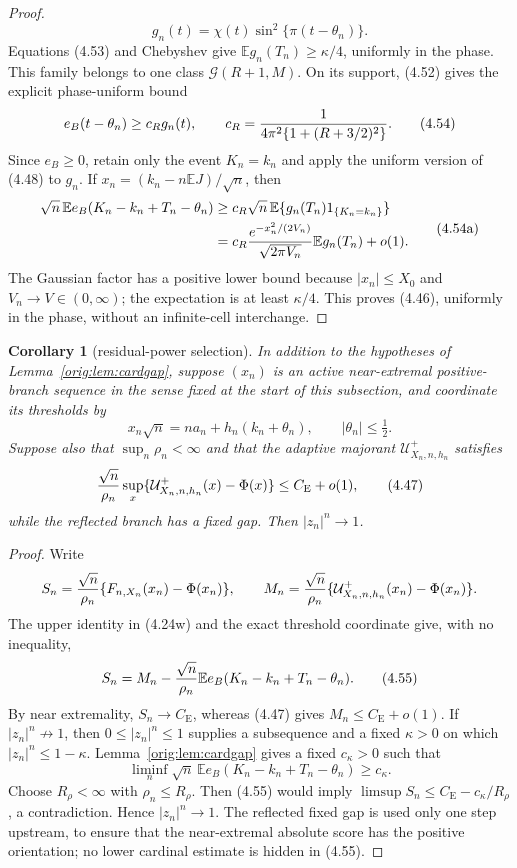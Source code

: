 \documentclass[11pt,a4paper]{article}
\numberwithin{equation}{section}
\newtheorem{corollary}[theorem]{Corollary}
\theoremstyle{definition}
\theoremstyle{remark}
\newcommand{\E}{\mathbb E}
\newcommand{\CE}{C_{\mathrm E}}
\begin{document}
\begin{proof}
\[
 g_n(t)=\chi(t)\sin^2\{\pi(t-\theta_n)\}.
\]
Equations (4.53) and Chebyshev give
\(\E g_n(T_n)\ge\kappa/4\), uniformly in the phase.  This family belongs
to one class \(\mathscr G(R+1,M)\).  On its support, (4.52) gives the
explicit phase-uniform bound
\[
 e_B(t-\theta_n)\ge c_Rg_n(t),\qquad
 c_R={1\over4\pi^2\{1+(R+3/2)^2\}}.                  \tag{4.54}
\]
Since $e_B\ge0$, retain only the event $K_n=k_n$ and apply the uniform
version of (4.48) to $g_n$.  If
\(x_n=(k_n-n\E J)/\sqrt n\), then
\[
 \begin{split}
 \sqrt n\,\E e_B(K_n-k_n+T_n-\theta_n)
 &\ge c_R\sqrt n\,
       \E\{g_n(T_n)1_{\{K_n=k_n\}}\}\\
 &=c_R{e^{-x_n^2/(2V_n)}\over\sqrt{2\pi V_n}}
       \E g_n(T_n)+o(1).
 \end{split}                                           \tag{4.54a}
\]
The Gaussian factor has a positive lower bound because
\(|x_n|\le X_0\) and \(V_n\to V\in(0,\infty)\); the expectation is at
least \(\kappa/4\).  This proves (4.46), uniformly in the phase, without
an infinite-cell interchange.
\end{proof}

\begin{corollary}[residual-power selection]\label{orig:cor:respower}
In addition to the hypotheses of Lemma~\ref{orig:lem:cardgap}, suppose
\((x_n)\) is an active near-extremal positive-branch sequence in the sense
fixed at the start of this subsection, and coordinate its thresholds by
\[
 x_n\sqrt n=na_n+h_n(k_n+\theta_n),\qquad |\theta_n|\le\tfrac12.
\]
Suppose also that $\sup_n\rho_n<\infty$ and that the adaptive majorant
 $\mathcal U^+_{X_n,n,h_n}$ satisfies
\[
 {\sqrt n\over\rho_n}\sup_x
       \{\mathcal U^+_{X_n,n,h_n}(x)-\Phi(x)\}
 \le\CE+o(1),                                         \tag{4.47}
\]
while the reflected branch has a fixed gap.  Then $|z_n|^n\to1$.
\end{corollary}

\begin{proof}
Write
\[
 S_n={\sqrt n\over\rho_n}\{F_{n,X_n}(x_n)-\Phi(x_n)\},\qquad
 M_n={\sqrt n\over\rho_n}
       \{\mathcal U^+_{X_n,n,h_n}(x_n)-\Phi(x_n)\}.
\]
The upper identity in (4.24w) and the exact threshold coordinate give,
with no inequality,
\[
 S_n=M_n-{\sqrt n\over\rho_n}
       \E e_B(K_n-k_n+T_n-\theta_n).                  \tag{4.55}
\]
By near extremality, \(S_n\to\CE\), whereas (4.47) gives
\(M_n\le\CE+o(1)\).  If \(|z_n|^n\not\to1\), then
\(0\le |z_n|^n\le1\) supplies a subsequence and a fixed \(\kappa>0\) on
which \(|z_n|^n\le1-\kappa\).  Lemma~\ref{orig:lem:cardgap} gives a fixed
\(c_\kappa>0\) such that
\[
 \liminf_n\sqrt n\,
 \E e_B(K_n-k_n+T_n-\theta_n)\ge c_\kappa.
\]
Choose \(R_\rho<\infty\) with \(\rho_n\le R_\rho\).  Then (4.55) would imply
\(\limsup S_n\le\CE-c_\kappa/R_\rho\), a contradiction.  Hence
\(|z_n|^n\to1\).  The reflected fixed gap is used only one step upstream,
to ensure that the near-extremal absolute score has the positive
orientation; no lower cardinal estimate is hidden in (4.55).
\end{proof}
\end{document}
